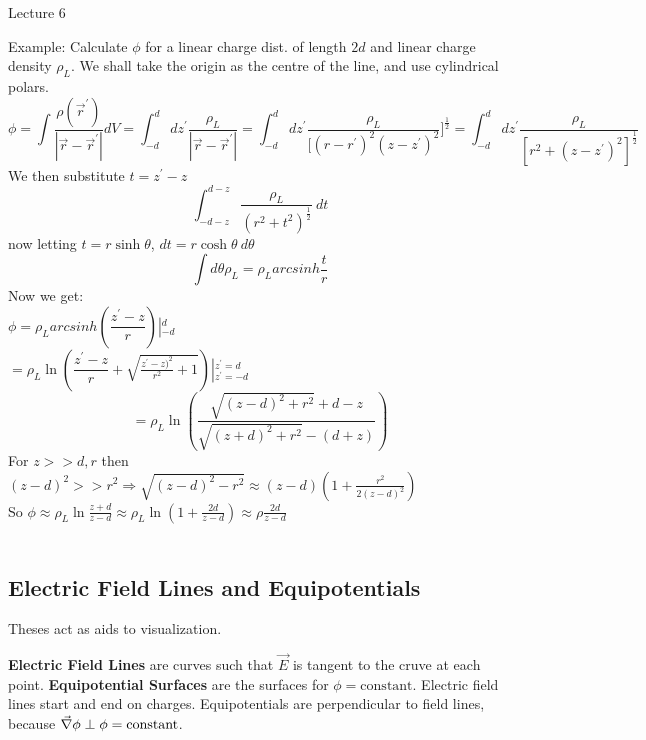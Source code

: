 \begin{center}

Lecture 6

\end{center}


Example: Calculate $\phi$ for a linear charge dist. of length $2d$ and linear charge density $\rho _{L}$.
We shall take the origin as the centre of the line, and use cylindrical polars.\\
$$\phi = \int \dfrac{\rho(\vec{r}^\prime)}{|\vec{r}-\vec{r}^\prime|} dV = \int^d _{-d} dz^\prime \dfrac{\rho_{L}}{|\vec{r}-\vec{r}^\prime|}=\int ^d _{-d} dz^\prime \dfrac{\rho_{L}}{[(r-r^\prime)^2(z-z^\prime)^2}]^\frac{1}{2} =\int^d _{-d} dz^\prime \dfrac{\rho _{L}}{[r^2 +(z-z^\prime)^2]^\frac{1}{2}}$$
We then substitute $t=z^\prime - z$\\
$$\int^{d-z} _{-d-z} \dfrac{\rho_{L}}{(r^2 + t^2)^\frac{1}{2}} ~dt$$
now letting $t=r\sinh\theta$, $dt=r\cosh\theta ~d\theta$\\
$$\int d\theta \rho_{L} = \rho_{L} arcsinh\frac{t}{r}$$
Now we get:\\
$\phi=\rho_{L} arcsinh\left(\dfrac{z^\prime -z}{r}\right) \left|^d _{-d} \right.$\\
$=\rho_{L} \ln\left(\dfrac{z^\prime - z}{r}+\sqrt{\frac{z^\prime-z)^2}{r^2}+1} \right )\left|^{z^\prime =d} _{z^\prime = -d} \right.$\\
$$=\rho_L \ln(\dfrac{\sqrt{(z-d)^2 +r^2}+d-z}{\sqrt{(z+d)^2 +r^2}-(d+z)})$$
For $z>>d,r$ then $(z-d)^2 >>r^2 \Rightarrow \sqrt{(z-d)^2 -r^2} \approx (z-d)(1+\frac{r^2}{2(z-d)^2})$\\
So $\phi \approx \rho_{L} \ln \frac{z+d}{z-d} \approx \rho_L \ln(1+\frac{2d}{z-d}) \approx \rho \frac{2d}{z-d}$\\ 
\\

\subsection{Electric Field Lines and Equipotentials}

Theses act as aids to visualization.

\textbf{Electric Field Lines} are curves such that $\vec{E}$ is tangent to the cruve at each point. \textbf{Equipotential Surfaces} are the surfaces for $\phi = \text{constant}$. Electric field lines start and end on charges. Equipotentials are perpendicular to field lines, because $\vec{\nabla} \phi \perp \phi = \text{constant}$.


